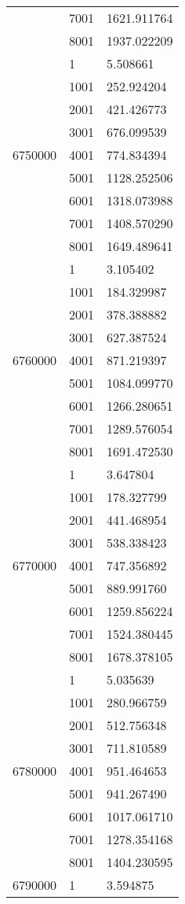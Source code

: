 \begin{table}[htb!]
\begin{tabular}{lll}
 & 7001 & 1621.911764 \\
 & 8001 & 1937.022209 \\
\multirow[c]{9}{*}{6750000} & 1 & 5.508661 \\
 & 1001 & 252.924204 \\
 & 2001 & 421.426773 \\
 & 3001 & 676.099539 \\
 & 4001 & 774.834394 \\
 & 5001 & 1128.252506 \\
 & 6001 & 1318.073988 \\
 & 7001 & 1408.570290 \\
 & 8001 & 1649.489641 \\
\multirow[c]{9}{*}{6760000} & 1 & 3.105402 \\
 & 1001 & 184.329987 \\
 & 2001 & 378.388882 \\
 & 3001 & 627.387524 \\
 & 4001 & 871.219397 \\
 & 5001 & 1084.099770 \\
 & 6001 & 1266.280651 \\
 & 7001 & 1289.576054 \\
 & 8001 & 1691.472530 \\
\multirow[c]{9}{*}{6770000} & 1 & 3.647804 \\
 & 1001 & 178.327799 \\
 & 2001 & 441.468954 \\
 & 3001 & 538.338423 \\
 & 4001 & 747.356892 \\
 & 5001 & 889.991760 \\
 & 6001 & 1259.856224 \\
 & 7001 & 1524.380445 \\
 & 8001 & 1678.378105 \\
\multirow[c]{9}{*}{6780000} & 1 & 5.035639 \\
 & 1001 & 280.966759 \\
 & 2001 & 512.756348 \\
 & 3001 & 711.810589 \\
 & 4001 & 951.464653 \\
 & 5001 & 941.267490 \\
 & 6001 & 1017.061710 \\
 & 7001 & 1278.354168 \\
 & 8001 & 1404.230595 \\
\multirow[c]{9}{*}{6790000} & 1 & 3.594875 \\

\end{tabular}
\end{table}
